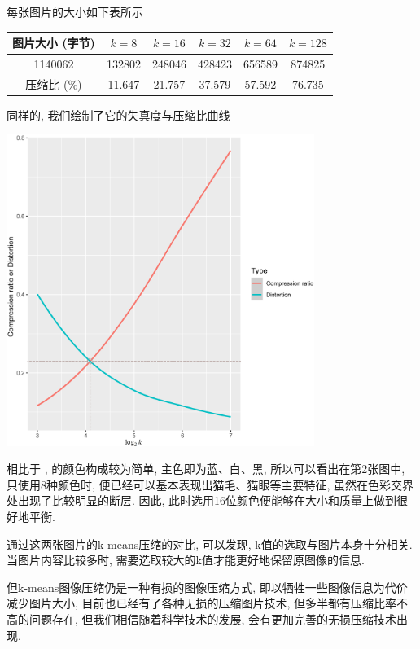 \documentclass[lang=cn,11pt]{elegantpaper}
\begin{document}
每张图片的大小如下表所示
\begin{table}[ht]
    \centering
    \begin{tabular}{c|ccccc}
    \hline
    图片大小 (字节)  & $k=8$    & $k=16$   & $k=32$   & $k=64$   & $k=128$  \\ \hline
    1140062  & 132802 & 248046 & 428423 & 656589 & 874825 \\
    压缩比 (\%) & 11.647 & 21.757 & 37.579 & 57.592 & 76.735 \\ \hline
    \end{tabular}
\end{table}

同样的, 我们绘制了它的失真度与压缩比曲线
\begin{center}
    \hspace{53pt}\includegraphics[width=0.75\textwidth]{cat2to}
\end{center}

相比于 ,  的颜色构成较为简单, 主色即为蓝、白、黑, 所以可以看出在第2张图中, 只使用8种颜色时, 便已经可以基本表现出猫毛、猫眼等主要特征, 虽然在色彩交界处出现了比较明显的断层. 因此, 此时选用16位颜色便能够在大小和质量上做到很好地平衡.

通过这两张图片的k-means压缩的对比, 可以发现, k值的选取与图片本身十分相关. 当图片内容比较多时, 需要选取较大的k值才能更好地保留原图像的信息. 

但k-means图像压缩仍是一种有损的图像压缩方式, 即以牺牲一些图像信息为代价减少图片大小, 目前也已经有了各种无损的压缩图片技术, 但多半都有压缩比率不高的问题存在, 但我们相信随着科学技术的发展, 会有更加完善的无损压缩技术出现. 
\end{document}
